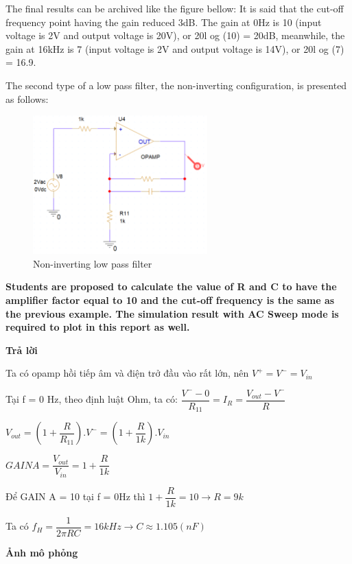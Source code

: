 \pagebreak

The final results can be archived like the figure bellow:
It is said that the cut-off frequency point having the gain reduced 3dB. The gain at 0Hz
is 10 (input voltage is 2V and output voltage is 20V), or 20l og (10) = 20dB, meanwhile, the
gain at 16kHz is 7 (input voltage is 2V and output voltage is 14V), or 20l og (7) = 16.9.

The second type of a low pass filter, the non-inverting configuration, is presented as follows:

\begin{figure}[ht]
    \centering
    \includegraphics[width=0.6\textwidth]{graphics/ex1/f18.png}
    \caption{Non-inverting low pass filter}
\end{figure}

\textbf{Students are proposed to calculate the value of R and C to have the amplifier factor
equal to 10 and the cut-off frequency is the same as the previous example. The simulation result with AC Sweep mode is required to plot in this report as well.
}

\pagebreak

\textbf{Trả lời}

Ta có opamp hồi tiếp âm và điện trở đầu vào rất lớn, nên $V^+ = V^- = V_{in}$

Tại f = 0 Hz, theo định luật Ohm, ta có: $\dfrac{V^- - 0}{R_{11}} = I_{R} = \dfrac{V_{out} - V^-}{R}$

$V_{out} = (1 + \dfrac{R}{R_{11}}).V^- = (1 + \dfrac{R}{1k}). V_{in}$

$GAIN A = \dfrac{V_{out}}{V_{in}} = 1 + \dfrac{R}{1k}$

Để GAIN A = 10 tại f = 0Hz thì $1 + \dfrac{R}{1k} = 10 \rightarrow R = 9k$

Ta có $f_{H} = \dfrac{1}{2\pi RC} = 16 kHz \rightarrow C \approx 1.105 (nF)$

\textbf{Ảnh mô phỏng}

